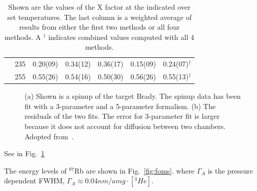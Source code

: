 \documentclass[pdftex,letterpaper,12pt]{report}
\begin{document}
\begin{table}
\begin{center}
\begin{tabular}{|c|c|cccc|c|}
			& 235 & 0.20(09) & 0.34(12) & 0.36(17) & 0.15(09) & 0.24(07)$^\dagger$\\
			& 255 & 0.55(26) & 0.54(16) & 0.50(30) & 0.56(26) & 0.55(13)$^\dagger$\\
			\hline
		\end{tabular}
		\caption
		{Shown are the values of the X factor at the indicated over set temperatures. The last column is a weighted average of results from either the first two methods or all four methods. A $^\dagger$ indicates combined values computed with all 4 methods.}
		\label{table:Xtable}
	\end{center}
\end{table}

\begin{figure}[H]
	\centering
	\caption{{(a) Shown is a spinup of the target Brady. The spinup data has been fit with a 3-parameter and a 5-parameter formalism. (b) The residuals of the two fits. The error for 3-parameter fit is larger because it does not account for diffusion between two chambers. Adopted from~\cite{PhysRevC.91.055205}.}}
	\label{spinup}
\end{figure}

See in Fig.~\ref{spinup}


	
The energy levels of $^{87}$Rb are shown in Fig.~\ref{fig:foms}.
where $\Gamma_{A}$ is the pressure dependent FWHM, $\Gamma_{A}\approx 0.04nm/amg \cdot [^{3}He]$.


\end{document}
